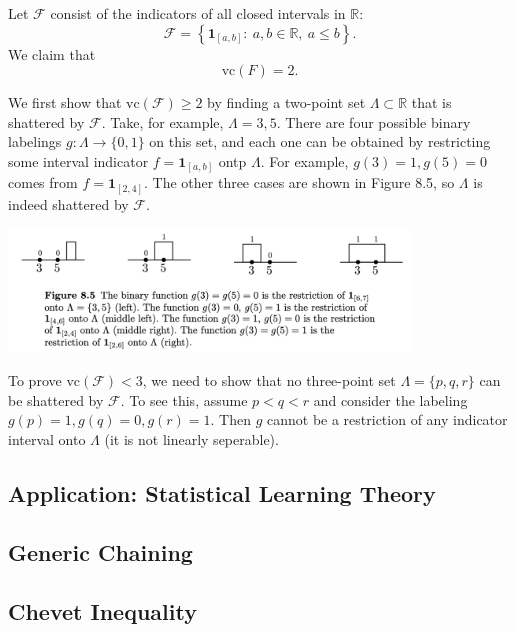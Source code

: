 \begin{example}[Intervals]
\label{ex:8.3.2}
Let $\mathcal{F}$ consist of the indicators of all closed intervals in $\mathbb{R}$:
\[ \mathcal{F} = \left\{ \mathbf{1}_{[a, b]}: \ a, b \in \mathbb{R}, \ a \leq b \right\}. \]
We claim that 
\[ \mathrm{vc}(F) = 2. \]

We first show that $\mathrm{vc}(\mathcal{F}) \geq 2$ by finding a two-point set $\Lambda \subset \mathbb{R}$ 
that is shattered by $\mathcal{F}$. Take, for example, $\Lambda = 3, 5$. There are four possible binary 
labelings $g: \Lambda \to \{0, 1\}$ on this set, and each one can be obtained by restricting some interval 
indicator $f = \mathbf{1}_{[a, b]}$ ontp $\Lambda$. For example, $g(3) = 1, g(5) = 0$ comes from 
$f = \mathbf{1}_{[2, 4]}$. The other three cases are shown in Figure 8.5, so $\Lambda$ is indeed shattered by 
$\mathcal{F}$.

\begin{center}
    \includegraphics[width=0.8\textwidth]{Chapter 8/fig8-5.png}
\end{center}

To prove $\mathrm{vc}(\mathcal{F}) < 3$, we need to show that no three-point set $\Lambda = \{p, q, r\}$ can 
be shattered by $\mathcal{F}$. To see this, assume $p < q < r$ and consider the labeling $g(p) = 1, g(q) = 0, 
g(r) = 1$. Then $g$ cannot be a restriction of any indicator interval onto $\Lambda$ (it is not linearly 
seperable).
\end{example}



\subsection{Application: Statistical Learning Theory}



\subsection{Generic Chaining}



\subsection{Chevet Inequality}



